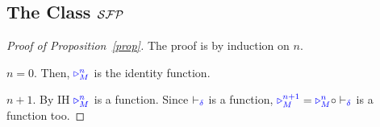 \subsection{The Class $\mathcal{SFP}$}
\label{app:c1}

\begin{proof}[Proof of Proposition~\ref{prop}]
The proof is by induction on $n$.

$n=0$. Then, $\textcolor{blue}{\triangleright^n_M}$ is the identity function.

$n+1$. By IH $\textcolor{blue}{\triangleright^n_M}$ is a function.
Since $\vdash_{\textcolor{blue}{\delta}}$ is a function,
$\textcolor{blue}{\triangleright^{n+1}_M} =
\textcolor{blue}{\triangleright^n_M} \circ \vdash_{\textcolor{blue}{\delta}}$
is a function too.
\end{proof}



































%
%

%







